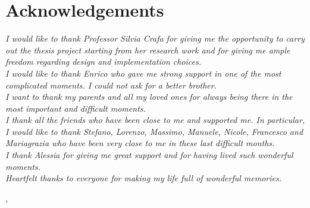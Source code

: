 
\cleardoublepage
{}
{}

\bigskip

\begingroup
\let\clearpage\relax
\let\cleardoublepage\relax
\let\cleardoublepage\relax

\chapter*{Acknowledgements}
\noindent \textit{I would like to thank Professor Silvia Crafa for giving me the opportunity to carry out 
the thesis project starting from her research work and for giving me ample freedom regarding design and 
implementation choices.}\\

\noindent \textit{I would like to thank Enrico who gave me strong support in one of the most complicated 
moments. I could not ask for a better brother.}\\

\noindent \textit{I want to thank my parents and all my loved ones for always being there in the most 
important and difficult moments.}\\

\noindent \textit{I thank all the friends who have been close to me and supported me. In particular, I 
would like to thank Stefano, Lorenzo, Massimo, Manuele, Nicole, Francesco and Mariagrazia who have been 
very close to me in these last difficult months.}\\

\noindent \textit{I thank Alessia for giving me great support and for having lived such wonderful 
moments.}\\

\noindent \textit{Heartfelt thanks to everyone for making my life full of wonderful memories.}\\

\bigskip

\noindent\textit{\myLocation, \myTime}
\hfill \myName

\endgroup

